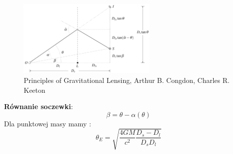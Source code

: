 \documentclass{beamer}
\begin{document}
\begin{frame}
    \begin{figure}
        \centering
        \includegraphics[width=0.6\textwidth]{Screenshot from 2024-06-10 13-41-41.png}
        \caption*{\tiny{Principles of Gravitational
                Lensing, Arthur B. Congdon, Charles R. Keeton \cite{Congdon2018}}}
    \end{figure}
    \textbf{Równanie soczewki}:
    \[\beta = \theta - \alpha(\theta)\]
    Dla punktowej masy mamy \cite{Schneider1992}:
    \[\theta_E = \sqrt{\frac{4GM}{c^2}\frac{D_s-D_l}{D_s D_l}}\]
\end{frame}
\end{document}
